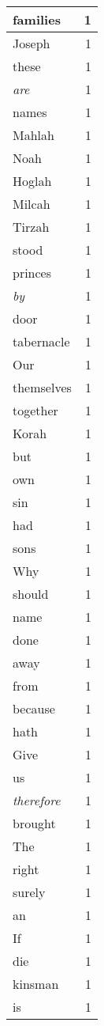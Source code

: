 \begin{center}
\begin{longtable}{l|r}
families & 1\\ \hline 
Joseph & 1\\ \hline 
these & 1\\ \hline 
\emph{are} & 1\\ \hline 
names & 1\\ \hline 
Mahlah & 1\\ \hline 
Noah & 1\\ \hline 
Hoglah & 1\\ \hline 
Milcah & 1\\ \hline 
Tirzah & 1\\ \hline 
stood & 1\\ \hline 
princes & 1\\ \hline 
\emph{by} & 1\\ \hline 
door & 1\\ \hline 
tabernacle & 1\\ \hline 
Our & 1\\ \hline 
themselves & 1\\ \hline 
together & 1\\ \hline 
Korah & 1\\ \hline 
but & 1\\ \hline 
own & 1\\ \hline 
sin & 1\\ \hline 
had & 1\\ \hline 
sons & 1\\ \hline 
Why & 1\\ \hline 
should & 1\\ \hline 
name & 1\\ \hline 
done & 1\\ \hline 
away & 1\\ \hline 
from & 1\\ \hline 
because & 1\\ \hline 
hath & 1\\ \hline 
Give & 1\\ \hline 
us & 1\\ \hline 
\emph{therefore} & 1\\ \hline 
brought & 1\\ \hline 
The & 1\\ \hline 
right & 1\\ \hline 
surely & 1\\ \hline 
an & 1\\ \hline 
If & 1\\ \hline 
die & 1\\ \hline 
kinsman & 1\\ \hline 
is & 1\\ \hline 

\end{longtable}
\end{center}
